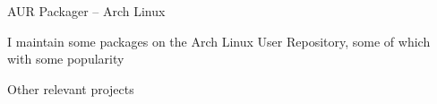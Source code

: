 \begin{cventries}
  \cventry
    {AUR Packager --
    \href{https://aur.archlinux.org/packages/?SeB=m&K=ljmf00}{\faLink\acvHeaderIconSep\@Packages}} %
    {Arch Linux} %
    {} %
    {} %
    {
      \begin{cvitems} %
        \item {I maintain some packages on the Arch Linux User Repository, some of which with some popularity}
      \end{cvitems}
    }

  \cventry
    {\href{https://github.com/pulls?q=is\%3Apr+author\%3Aljmf00+archived\%3Afalse+is\%3Aclosed}{\faGithubSquare\acvHeaderIconSep\@Contributions}} %
    {Other relevant projects} %
    {} %
    {} %
    {}

\end{cventries}
